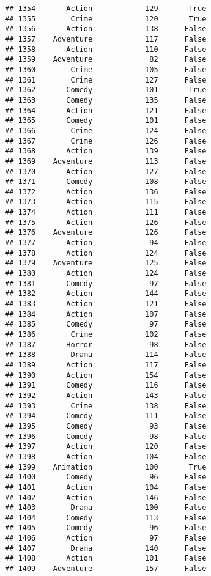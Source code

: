 \documentclass[
]{article}
\begin{document}
\begin{verbatim}
## 1354       Action            129       True
## 1355        Crime            120       True
## 1356       Action            138      False
## 1357    Adventure            117      False
## 1358       Action            110      False
## 1359    Adventure             82      False
## 1360        Crime            105      False
## 1361        Crime            127      False
## 1362       Comedy            101       True
## 1363       Comedy            135      False
## 1364       Action            121      False
## 1365       Comedy            101      False
## 1366        Crime            124      False
## 1367        Crime            126      False
## 1368       Action            139      False
## 1369    Adventure            113      False
## 1370       Action            127      False
## 1371       Comedy            108      False
## 1372       Action            136      False
## 1373       Action            115      False
## 1374       Action            111      False
## 1375       Action            126      False
## 1376    Adventure            126      False
## 1377       Action             94      False
## 1378       Action            124      False
## 1379    Adventure            125      False
## 1380       Action            124      False
## 1381       Comedy             97      False
## 1382       Action            144      False
## 1383       Action            121      False
## 1384       Action            107      False
## 1385       Comedy             97      False
## 1386        Crime            102      False
## 1387       Horror             98      False
## 1388        Drama            114      False
## 1389       Action            117      False
## 1390       Action            154      False
## 1391       Comedy            116      False
## 1392       Action            143      False
## 1393        Crime            138      False
## 1394       Comedy            111      False
## 1395       Comedy             93      False
## 1396       Comedy             98      False
## 1397       Action            120      False
## 1398       Action            104      False
## 1399    Animation            100       True
## 1400       Comedy             96      False
## 1401       Action            104      False
## 1402       Action            146      False
## 1403        Drama            100      False
## 1404       Comedy            113      False
## 1405       Comedy             96      False
## 1406       Action             97      False
## 1407        Drama            140      False
## 1408       Action            101      False
## 1409    Adventure            157      False

\end{verbatim}
\end{document}
